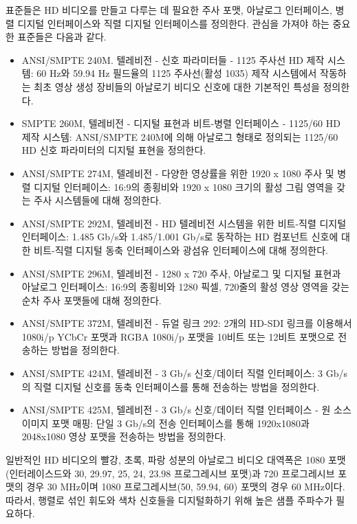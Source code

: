 표준들은 HD 비디오를 만들고 다루는 데 필요한 주사 포맷, 아날로그 인터페이스, 병렬 디지털 인터페이스와 직렬 디지털 인터페이스를 정의한다. 관심을 가져야 하는 중요한 표준들은 다음과 같다.
\begin{itemize}
    \item ANSI/SMPTE 240M. 텔레비전 - 신호 파라미터들 - 1125 주사선 HD 제작 시스템: 60 Hz와 59.94 Hz 필드율의 1125 주사선(활성 1035) 제작 시스템에서 작동하는 최초 영상 생성 장비들의 아날로기 비디오 신호에 대한 기본적인 특성을 정의한다.
    \item SMPTE 260M, 텔레비전 - 디지털 표현과 비트-병렬 인터페이스 - 1125/60 HD 제작 시스템: ANSI/SMPTE 240M에 의해 아날로그 형태로 정의되는 1125/60 HD 신호 파라미터의 디지털 표현을 정의한다.
    \item ANSI/SMPTE 274M, 텔레비전 - 다양한 영상률을 위한 1920 x 1080 주사 및 병렬 디지털 인터페이스: 16:9의 종횡비와 1920 x 1080 크기의 활성 그림 영역을 갖는 주사 시스템들에 대해 정의한다.
    \item ANSI/SMPTE 292M, 텔레비전 - HD 텔레비전 시스템을 위한 비트-직렬 디지털 인터페이스: 1.485 Gb/s와 1.485/1.001 Gb/s로 동작하는 HD 컴포넌트 신호에 대한 비트-직렬 디지털 동축 인터페이스와 광섬유 인터페이스에 대해 정의한다.
    \item ANSI/SMPTE 296M, 텔레비전 - 1280 x 720 주사, 아날로그 및 디지털 표현과 아날로그 인터페이스: 16:9의 종횡비와 1280 픽셀, 720줄의 활성 영상 영역을 갖는 순차 주사 포맷들에 대해 정의한다.
    \item ANSI/SMPTE 372M, 텔레비전 - 듀얼 링크 292: 2개의 HD-SDI 링크를 이용해서 1080i/p YCbCr 포맷과 RGBA 1080i/p 포맷을 10비트 또는 12비트 포맷으로 전송하는 방법을 정의한다.
    \item ANSI/SMPTE 424M, 텔레비전 - 3 Gb/s 신호/데이터 직렬 인터페이스: 3 Gb/s의 직렬 디지털 신호를 동축 인터페이스를 통해 전송하는 방법을 정의한다.
    \item ANSI/SMPTE 425M, 텔레비전 - 3 Gb/s 신호/데이터 직렬 인터페이스 - 원 소스 이미지 포맷 매핑: 단일 3 Gb/s의 전송 인터페이스를 통해 1920x1080과 2048x1080 영상 포맷을 전송하는 방법을 정의한다.
\end{itemize}

일반적인 HD 비디오의 빨강, 초록, 파랑 성분의 아날로그 비디오 대역폭은 1080 포맷(인터레이스드와 30, 29.97, 25, 24, 23.98 프로그레시브 포맷)과 720 프로그레시브 포맷의 경우 30 MHz이며 1080 프로그레시브(50, 59.94, 60) 포맷의 경우 60 MHz이다.
따라서, 행렬로 섞인 휘도와 색차 신호들을 디지털화하기 위해 높은 샘플 주파수가 필요하다.